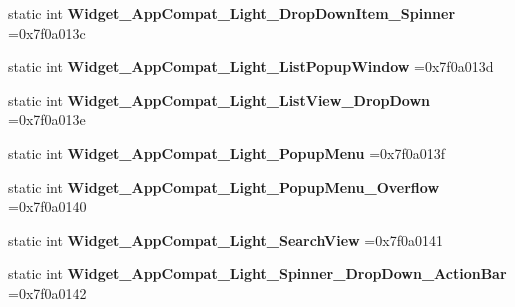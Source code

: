 \begin{DoxyCompactItemize}
static int {\bfseries Widget\+\_\+\+App\+Compat\+\_\+\+Light\+\_\+\+Drop\+Down\+Item\+\_\+\+Spinner} =0x7f0a013c
\item 
\mbox{\label{classandroid_1_1support_1_1graphics_1_1drawable_1_1animated_1_1R_1_1style_ab9bf59a57b6cfed05ee386565c0afb21}} 
static int {\bfseries Widget\+\_\+\+App\+Compat\+\_\+\+Light\+\_\+\+List\+Popup\+Window} =0x7f0a013d
\item 
\mbox{\label{classandroid_1_1support_1_1graphics_1_1drawable_1_1animated_1_1R_1_1style_a8e7d020c1488236adeb2e10084f5e9db}} 
static int {\bfseries Widget\+\_\+\+App\+Compat\+\_\+\+Light\+\_\+\+List\+View\+\_\+\+Drop\+Down} =0x7f0a013e
\item 
\mbox{\label{classandroid_1_1support_1_1graphics_1_1drawable_1_1animated_1_1R_1_1style_aec0af01b80f7a68f0c063d9eddd17fbc}} 
static int {\bfseries Widget\+\_\+\+App\+Compat\+\_\+\+Light\+\_\+\+Popup\+Menu} =0x7f0a013f
\item 
\mbox{\label{classandroid_1_1support_1_1graphics_1_1drawable_1_1animated_1_1R_1_1style_a3b0448383b82bfd9961e36e334c5e629}} 
static int {\bfseries Widget\+\_\+\+App\+Compat\+\_\+\+Light\+\_\+\+Popup\+Menu\+\_\+\+Overflow} =0x7f0a0140
\item 
\mbox{\label{classandroid_1_1support_1_1graphics_1_1drawable_1_1animated_1_1R_1_1style_a3e7877f7f60f9e70e125fa9865250b28}} 
static int {\bfseries Widget\+\_\+\+App\+Compat\+\_\+\+Light\+\_\+\+Search\+View} =0x7f0a0141
\item 
\mbox{\label{classandroid_1_1support_1_1graphics_1_1drawable_1_1animated_1_1R_1_1style_a9bae6ad2fa350d2adbeeaeab52f7d417}} 
static int {\bfseries Widget\+\_\+\+App\+Compat\+\_\+\+Light\+\_\+\+Spinner\+\_\+\+Drop\+Down\+\_\+\+Action\+Bar} =0x7f0a0142
\item 
\mbox{\label{classandroid_1_1support_1_1graphics_1_1drawable_1_1animated_1_1R_1_1style_a91cf1546e4b2a0c5e5790da8d6c8eea8}} 

\end{DoxyCompactItemize}

